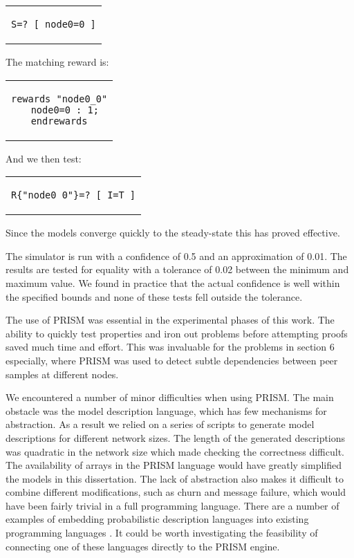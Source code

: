 \documentclass[a4paper,10pt]{article}
\newenvironment{prismprop}[0]{
  \begin{center}
  \begin{tabular}{c}
  \footnotesize
}{
  \end{tabular}
  \end{center}
}
\begin{document}
\begin{prismprop}
\begin{lstlisting}
S=? [ node0=0 ]
\end{lstlisting}
\end{prismprop}

\noindent The matching reward is:

\begin{prismprop}
\begin{lstlisting}
rewards "node0_0"
  node0=0 : 1;
endrewards
\end{lstlisting}
\end{prismprop}

\noindent And we then test:

\begin{prismprop}
\begin{lstlisting}
R{"node0_0"}=? [ I=T ]
\end{lstlisting}
\end{prismprop}

Since the models converge quickly to the steady-state this has proved effective. 

The simulator is run with a confidence of 0.5 and an approximation of 0.01. The results are tested for equality with a tolerance of 0.02 between the minimum and maximum value. We found in practice that the actual confidence is well within the specified bounds and none of these tests fell outside the tolerance.

The use of PRISM was essential in the experimental phases of this work. The ability to quickly test properties and iron out problems before attempting proofs saved much time and effort. This was invaluable for the problems in section 6 especially, where PRISM was used to detect subtle dependencies between peer samples at different nodes. 

We encountered a number of minor difficulties when using PRISM. The main obstacle was the model description language, which has few mechanisms for abstraction. As a result we relied on a series of scripts to generate model descriptions for different network sizes. The length of the generated descriptions was quadratic in the network size which made checking the correctness difficult. The availability of arrays in the PRISM language would have greatly simplified the models in this dissertation. The lack of abstraction also makes it difficult to combine different modifications, such as churn and message failure, which would have been fairly trivial in a full programming language. There are a number of examples of embedding probabilistic description languages into existing programming languages \cite{pfp, ocaml_cont}. It could be worth investigating the feasibility of connecting one of these languages directly to the PRISM engine. 
\end{document}
